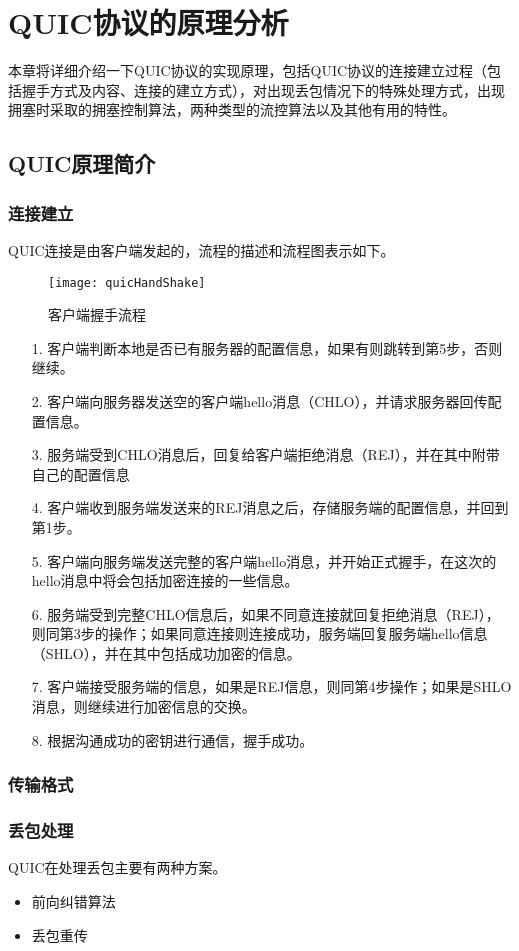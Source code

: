 \chapter{QUIC协议的原理分析}
本章将详细介绍一下QUIC协议的实现原理，包括QUIC协议的连接建立过程（包括握手方式及内容、连接的建立方式），对出现丢包情况下的特殊处理方式，出现拥塞时采取的拥塞控制算法，两种类型的流控算法以及其他有用的特性。
\section{QUIC原理简介}

\subsection{连接建立}
QUIC连接是由客户端发起的，流程的描述和流程图表示如下。
\begin{figure}
  \centering
  \texttt{[image: quicHandShake]}
  \label{fig:quichandshake}
  \caption{客户端握手流程}
\end{figure}
\begin{itemize}
  \item[1.] 客户端判断本地是否已有服务器的配置信息，如果有则跳转到第5步，否则继续。
  \item[2.] 客户端向服务器发送空的客户端hello消息（CHLO），并请求服务器回传配置信息。
  \item[3.] 服务端受到CHLO消息后，回复给客户端拒绝消息（REJ），并在其中附带自己的配置信息
  \item[4.] 客户端收到服务端发送来的REJ消息之后，存储服务端的配置信息，并回到第1步。
  \item[5.] 客户端向服务端发送完整的客户端hello消息，并开始正式握手，在这次的hello消息中将会包括加密连接的一些信息。
  \item[6.] 服务端受到完整CHLO信息后，如果不同意连接就回复拒绝消息（REJ），则同第3步的操作；如果同意连接则连接成功，服务端回复服务端hello信息（SHLO），并在其中包括成功加密的信息。
  \item[7.] 客户端接受服务端的信息，如果是REJ信息，则同第4步操作；如果是SHLO消息，则继续进行加密信息的交换。
  \item[8.] 根据沟通成功的密钥进行通信，握手成功。
\end{itemize}

\subsection{传输格式}

\subsection{丢包处理}
QUIC在处理丢包主要有两种方案。
\begin{itemize}
  \item 前向纠错算法
  \item 丢包重传
\end{itemize}
